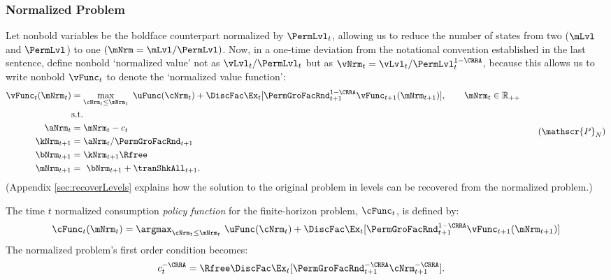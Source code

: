 \documentclass[BufferStockTheory]{subfiles}
\begin{document}
\hypertarget{The-Problem-Can-Be-Rewritten-in-Ratio-Form}{}
\hypertarget{The-Problem-Can-Be-Normalized-By-Permanent-Income}{}
\subsubsection{Normalized Problem}\label{subsubsec:ratio}

Let nonbold variables be the boldface counterpart normalized by $\PermLvl_{t}$, allowing us to reduce the number of states from two ($\mLvl$ and $\PermLvl$) to one $(\mNrm = \mLvl/\PermLvl)$.  Now, in a one-time deviation from the notational convention established in the last sentence, define nonbold `normalized value' not as $\vLvl_{t}/\PermLvl_{t}$ but as $\vNrm_{t} = \vLvl_{t}/\PermLvl_{t}^{1-\CRRA}$, because this allows us to write nonbold $\vFunc_{t}$ to denote the `normalized value function':
%
%
\begin{equation}\label{eq:veqnNrmRecBellman}
  \begin{split}
    \vFunc_{t}(\mNrm_{t})  & = \max_{\cNrm_{t}\leq \mNrm_{t}}~  \uFunc(\cNrm_{t}) +\DiscFac \Ex_{t}[\PermGroFacRnd_{t+1}^{1-\CRRA}\vFunc_{t+1}({\mNrm}_{t+1})],\qquad  \mNrm_{t}\in \mathbb{R}_{++}\\
    & \mbox{s.t.}
    \\ {\aNrm}_{t}  & = \mNrm_{t}-c_{t}
    \\ {\kNrm}_{t+1} & = \aNrm_{t}/\PermGroFacRnd_{t+1} %
    \\ {\bNrm}_{t+1} & = \kNrm_{t+1} \Rfree %
    \\ \mNrm_{t+1}  & = ~ \bNrm_{t+1} +\tranShkAll_{t+1} .
  \end{split}  \tag{$\mathscr{P}_{N}$}
\end{equation}
(Appendix \ref{sec:recoverLevels} explains how the solution to the original problem in levels can be recovered from the normalized problem.)

The time $t$ normalized consumption \textit{policy function} for the finite-horizon problem, $\cFunc_{t}$, is defined by:
%
%
\begin{equation}\label{eq: cfunceq1}
    \cFunc_{t}(\mNrm_{t})  = \argmax_{\cNrm_{t}\leq \mNrm_{t}}~  \uFunc(\cNrm_{t}) +\DiscFac \Ex_{t}[\PermGroFacRnd_{t+1}^{1-\CRRA}\vFunc_{t+1}(\mNrm_{t+1} )]  
\end{equation}
% 
The normalized problem's first order condition becomes:
\begin{align}
  c_{t}^{-\CRRA}  & = \Rfree \DiscFac \Ex_{t}[ {\PermGroFacRnd}_{t+1}^{-\CRRA} {\cNrm}
                    _{t+1}^{-\CRRA}].  \label{eq:scaledeuler}
\end{align}
\end{document}
